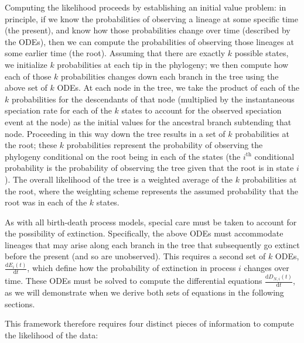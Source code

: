 Computing the likelihood proceeds by establishing an initial value problem: in principle, if we know the probabilities of observing a lineage at some specific time (\EG the present), and know how those probabilities change over time (described by the ODEs), then we can compute the probabilities of observing those lineages at some earlier time (\EG the root).
Assuming that there are exactly $k$ possible states, we initialize $k$ probabilities at each tip in the phylogeny; we then compute how each of those $k$ probabilities changes down each branch in the tree using the above set of $k$ ODEs.
At each node in the tree, we take the product of each of the $k$ probabilities for the descendants of that node (multiplied by the instantaneous speciation rate for each of the $k$ states to account for the observed speciation event at the node) as the initial values for the ancestral branch subtending that node.
Proceeding in this way down the tree results in a set of $k$ probabilities at the root; these $k$ probabilities represent the probability of observing the phylogeny conditional on the root being in each of the states (\IE the $i^\text{th}$ conditional probability is the probability of observing the tree given that the root is in state $i$).
The overall likelihood of the tree is a weighted average of the $k$ probabilities at the root, where the weighting scheme represents the assumed probability that the root was in each of the $k$ states.

As with all birth-death process models, special care must be taken to account for the possibility of extinction.
Specifically, the above ODEs must accommodate lineages that may arise along each branch in the tree that subsequently go extinct before the present (and so are unobserved).
This requires a second set of $k$ ODEs, $\frac{ \mathrm{d}E_{i}(t)}{\mathrm{d}t}$, which define how the probability of extinction in process $i$ changes over time.
These ODEs must be solved to compute the differential equations $\frac{ \mathrm{d}D_{N,i}(t)}{\mathrm{d}t}$, as we will demonstrate when we derive both sets of equations in the following sections.

This framework therefore requires four distinct pieces of information to compute the likelihood of the data:

